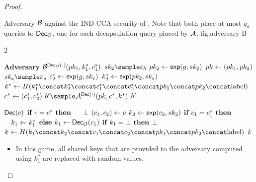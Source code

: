 \begin{proof}
\begin{itemize}
        \begin{gamefigure}{ Adversary $\mathcal{B}$ against the IND-CCA
                security of \kem. Note that both place at most $q_d$ queries
                to $\textsf{Dec}_O$, one for each decapsulation query placed by
                $\mathcal{A}$.  }{fig:adversary-B}
            \begin{games}{2}
                \begin{gameenv}{\textbf{Adversary} $\mathcal{B}^{\textsf{Dec}_O(\cdot)}(pk_1, k^*_1, c^*_1)$}
                    \State $\sk_2 \sample \honestexponent$
                    \State $pk_2 \leftarrow \textsf{exp}(g, sk_2)$
                    \State $pk \leftarrow (pk_1, pk_2)$
                    \State $\sk_e \sample \exponent$
                    \State $c^*_2 \leftarrow \textsf{exp}(g, sk_e)$
                    \State $k^*_2 \leftarrow \textsf{exp}(pk_2, sk_e)$
                    \State $k^* \assign H(\hashinputchallenges)$ \label{line:b-real-ug}
                    \State $c^* \leftarrow (c_1^*, c_2^*)$
                    \State $b' \sample \adversary{A}^{\dec(\cdot)}(\pk, c^*, k^*)$
                    \State \Return $b'$
                \end{gameenv}
                \gamebreak
                \begin{gameenv}{\oracle $\textsf{Dec}(c)$}
                    \State $\textbf{if } c = c^* \textbf{ then}$
                    \State $\quad$ \Return $\bot$
                    \State $(c_1, c_2) \leftarrow c$
                    \State $k_2 \leftarrow \textsf{exp}(c_2, sk_2)$
                    \State $\textbf{if } c_1 = c^*_1 \textbf{ then}$
                    \State $\quad k_1 \leftarrow k^*_1$
                    \State $\textbf{else } k_1 \leftarrow \textsf{Dec}_O(c_1)$
                    \State $\textbf{if } k_1 = \bot \textbf{ then}$
                    \State \quad \Return $\bot$
                    \State $k \assign H(\hashinput)$
                    \State \Return $k$
                \end{gameenv}
            \end{games}
        \end{gamefigure}

    \end{itemize}

    \begin{itemize}
    \item[\textbf{Game 2}]
        In this game, all \ug shared keys that are provided to the adversary
        computed using $k_1^*$ are replaced with random values.


\end{itemize}
\end{proof}
